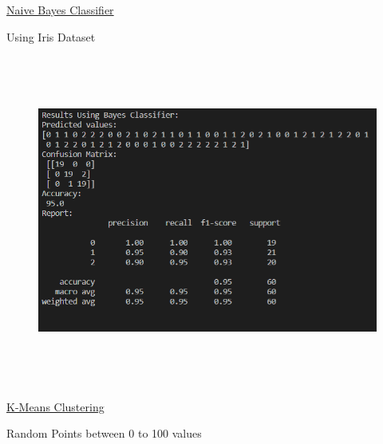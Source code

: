\documentclass[12pt]{article}
\renewcommand{\_}{\kern-1.5pt\textunderscore\kern-1.5pt}
\begin{document}
\vspace{\baselineskip}
{\fontsize{14pt}{16.8pt}\selectfont \uline{Naive Bayes Classifier}\par}\par

{\fontsize{14pt}{16.8pt}\selectfont Using Iris Dataset\par}\par




\begin{figure}[H]
	\begin{Center}
		\includegraphics[width=6.5in,height=4.29in]{./media/image14.png}
	\end{Center}
\end{figure}



\par

{\fontsize{14pt}{16.8pt}\selectfont \uline{K-Means Clustering}\par}\par

{\fontsize{14pt}{16.8pt} Random Points between 0 to 100 values\par}\par



\end{document}
